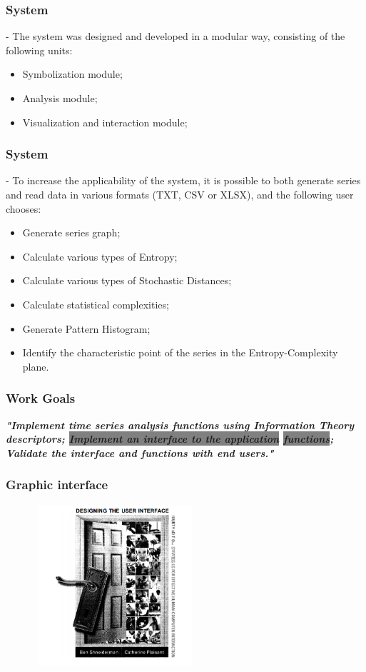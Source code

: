 \documentclass[10pt, compress]{beamer}
\begin{document}
\begin{frame}[fragile]
\frametitle{System}

- The system was designed and developed in a modular way, consisting of the following units:

\begin{itemize}
\item Symbolization module;
\item Analysis module;
\item Visualization and interaction module;
\end{itemize} 

\end{frame}

\begin{frame}[fragile]
\frametitle{System}

- To increase the applicability of the system, it is possible to both generate series and read data in various formats (TXT, CSV or XLSX), and the following user chooses:

\begin{itemize}
\item Generate series graph;
\item Calculate various types of Entropy;
\item Calculate various types of Stochastic Distances;
\item Calculate statistical complexities;
\item Generate Pattern Histogram;
\item Identify the characteristic point of the series in the Entropy-Complexity plane.
\end{itemize}

\end{frame}

\begin{frame}[fragile]
\frametitle{Work Goals}
\begin{sloppypar}
\textit{\textbf{\Large "Implement time series analysis functions using Information Theory descriptors; \colorbox{gray}{Implement an interface to the application}
\colorbox{gray}{functions}; Validate the interface and functions with end users."}}
\end{sloppypar}
\end{frame}

\begin{frame}[fragile]
\frametitle{Graphic interface}
\begin{figure}
  \centering
   \includegraphics[width=6cm,height=6cm]{interface.png}
\end{figure}
\end{frame}
\end{document}

